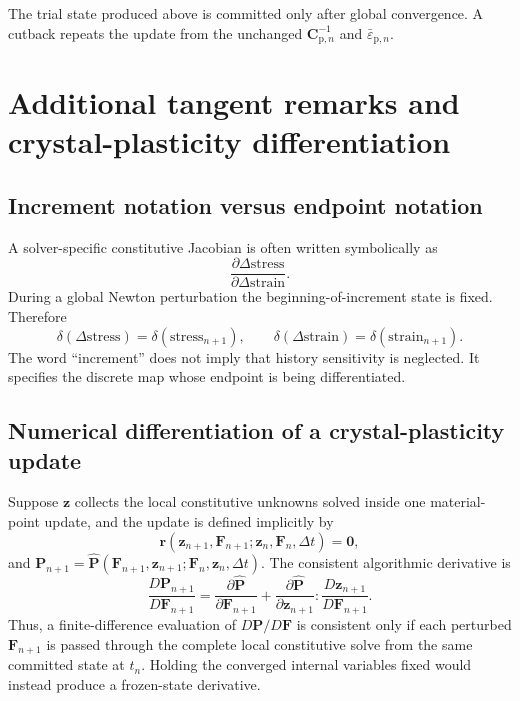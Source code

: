 \documentclass[11pt,a4paper]{article}
\newcommand{\bs}[1]{\boldsymbol{#1}}
\newcommand{\F}{\bs{F}}
\newcommand{\Pstress}{\bs{P}}
\begin{document}
The trial state produced above is committed only after global convergence.  A cutback repeats the update from the unchanged $\bs C_{\mathrm p,n}^{-1}$ and $\bar\varepsilon_{\mathrm p,n}$.

\section{Additional tangent remarks and crystal-plasticity differentiation}
\label{app:tangent-notes}
\subsection{Increment notation versus endpoint notation}

A solver-specific constitutive Jacobian is often written symbolically as
\begin{equation}
\frac{\partial\Delta\text{stress}}
{\partial\Delta\text{strain}}.
\end{equation}
During a global Newton perturbation the beginning-of-increment state is fixed. Therefore
\begin{equation}
\delta(\Delta\text{stress})=\delta(\text{stress}_{n+1}),
\qquad
\delta(\Delta\text{strain})=\delta(\text{strain}_{n+1}).
\end{equation}
The word ``increment'' does not imply that history sensitivity is neglected. It specifies the discrete map whose endpoint is being differentiated.


\subsection{Numerical differentiation of a crystal-plasticity update}

Suppose $\bs z$ collects the local constitutive unknowns solved inside one material-point update, and the update is defined implicitly by
\begin{equation}
\bs{r}\left(\bs z_{n+1},\F_{n+1};\bs z_n,\F_n,\Delta t\right)=\bs{0},
\end{equation}
and $\Pstress_{n+1}=\widehat{\Pstress}(\F_{n+1},\bs z_{n+1};\F_n,\bs z_n,\Delta t)$. The consistent algorithmic derivative is
\begin{equation}
\frac{D\Pstress_{n+1}}{D\F_{n+1}}
=
\frac{\partial\widehat{\Pstress}}{\partial\F_{n+1}}
+
\frac{\partial\widehat{\Pstress}}{\partial\bs z_{n+1}}
:
\frac{D\bs z_{n+1}}{D\F_{n+1}}.
\label{eq:alg-total-derivative}
\end{equation}
Thus, a finite-difference evaluation of $D\Pstress/D\F$ is consistent only if each perturbed $\F_{n+1}$ is passed through the complete local constitutive solve from the same committed state at $t_n$. Holding the converged internal variables fixed would instead produce a frozen-state derivative.
\end{document}
